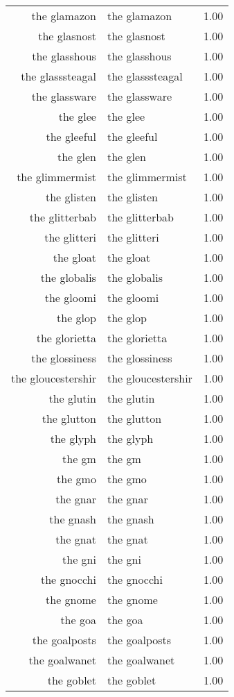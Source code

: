 \begin{table}[ht]
\begin{tabular}{rlr}
  the glamazon & the glamazon & 1.00 \\ 
  the glasnost & the glasnost & 1.00 \\ 
  the glasshous & the glasshous & 1.00 \\ 
  the glasssteagal & the glasssteagal & 1.00 \\ 
  the glassware & the glassware & 1.00 \\ 
  the glee & the glee & 1.00 \\ 
  the gleeful & the gleeful & 1.00 \\ 
  the glen & the glen & 1.00 \\ 
  the glimmermist & the glimmermist & 1.00 \\ 
  the glisten & the glisten & 1.00 \\ 
  the glitterbab & the glitterbab & 1.00 \\ 
  the glitteri & the glitteri & 1.00 \\ 
  the gloat & the gloat & 1.00 \\ 
  the globalis & the globalis & 1.00 \\ 
  the gloomi & the gloomi & 1.00 \\ 
  the glop & the glop & 1.00 \\ 
  the glorietta & the glorietta & 1.00 \\ 
  the glossiness & the glossiness & 1.00 \\ 
  the gloucestershir & the gloucestershir & 1.00 \\ 
  the glutin & the glutin & 1.00 \\ 
  the glutton & the glutton & 1.00 \\ 
  the glyph & the glyph & 1.00 \\ 
  the gm & the gm & 1.00 \\ 
  the gmo & the gmo & 1.00 \\ 
  the gnar & the gnar & 1.00 \\ 
  the gnash & the gnash & 1.00 \\ 
  the gnat & the gnat & 1.00 \\ 
  the gni & the gni & 1.00 \\ 
  the gnocchi & the gnocchi & 1.00 \\ 
  the gnome & the gnome & 1.00 \\ 
  the goa & the goa & 1.00 \\ 
  the goalposts & the goalposts & 1.00 \\ 
  the goalwanet & the goalwanet & 1.00 \\ 
  the goblet & the goblet & 1.00 \\ 

\end{tabular}
\end{table}
